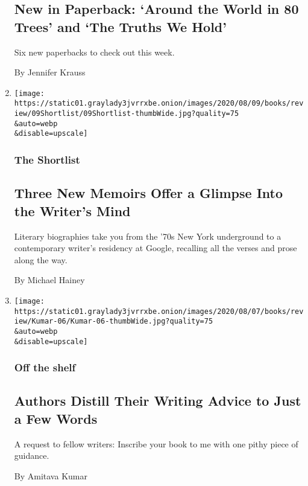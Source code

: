 \begin{enumerate}
  \hypertarget{new-in-paperback-around-the-world-in-80-trees-and-the-truths-we-hold}{%
  \subsection{New in Paperback: `Around the World in 80 Trees' and `The
  Truths We
  Hold'}\label{new-in-paperback-around-the-world-in-80-trees-and-the-truths-we-hold}}

  Six new paperbacks to check out this week.

  By Jennifer Krauss
\item
  \href{/2020/08/07/books/review/three-new-memoirs-offer-a-glimpse-into-the-writers-mind.html}{}

  \texttt{[image: https://static01.graylady3jvrrxbe.onion/images/2020/08/09/books/review/09Shortlist/09Shortlist-thumbWide.jpg?quality=75\\\&auto=webp\\\&disable=upscale]}

  \hypertarget{the-shortlist}{%
  \subsubsection{The Shortlist}\label{the-shortlist}}

  \hypertarget{three-new-memoirs-offer-a-glimpse-into-the-writers-mind}{%
  \subsection{Three New Memoirs Offer a Glimpse Into the Writer's
  Mind}\label{three-new-memoirs-offer-a-glimpse-into-the-writers-mind}}

  Literary biographies take you from the '70s New York underground to a
  contemporary writer's residency at Google, recalling all the verses
  and prose along the way.

  By Michael Hainey
\item
  \href{/2020/08/07/books/zadie-smith-lydia-davis-yiyun-li-mark-doty-jamaica-kincaid-colum-mccann-jenny-offill-tommy-orange.html}{}

  \texttt{[image: https://static01.graylady3jvrrxbe.onion/images/2020/08/07/books/review/Kumar-06/Kumar-06-thumbWide.jpg?quality=75\\\&auto=webp\\\&disable=upscale]}

  \hypertarget{off-the-shelf}{%
  \subsubsection{Off the shelf}\label{off-the-shelf}}

  \hypertarget{authors-distill-their-writing-advice-to-just-a-few-words}{%
  \subsection{Authors Distill Their Writing Advice to Just a Few
  Words}\label{authors-distill-their-writing-advice-to-just-a-few-words}}

  A request to fellow writers: Inscribe your book to me with one pithy
  piece of guidance.

  By Amitava Kumar
\end{enumerate}

